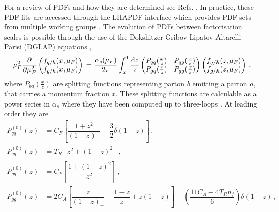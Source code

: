 \documentclass[main.tex]{subfiles}
\begin{document}
    For a review of PDFs and how they are determined
    see Refs. \cite{Ethier:2020way,Jimenez-Delgado:2013sma}.
    In practice, these PDF fits are accessed through the
    LHAPDF interface \cite{Buckley:2014ana} which provides
    PDF sets from multiple working groups \cite{PDF4LHCWorkingGroup:2022cjn,Hou:2019efy,Bailey:2020ooq,NNPDF:2021njg}.
    The evolution of PDFs between factorisation scales is possible
    through the use of the Dokshitzer-Gribov-Lipatov-Altarelli-Parisi (DGLAP)
    equations \cite{Dokshitzer:1977sg,Gribov:1972ri,Lipatov:1974qm,Altarelli:1977zs},
    \begin{equation}\label{eqn:DGLAP}
        \mu_{F}^{2} \dfrac{\partial}{\partial \mu_{F}^{2}}
        \begin{pmatrix}
            f_{q/h}(x,\mu_{F}) \\
            f_{g/h}(x,\mu_{F})
        \end{pmatrix} \\
        = \dfrac{\alpha_{s}(\mu_{F})}{2\pi} \int_{x}^{1} \dfrac{\mathrm{d}z}{z}
        \begin{pmatrix}
            P_{qq}(\frac{x}{z}) & P_{qg}(\frac{x}{z}) \\
            P_{gq}(\frac{x}{z}) & P_{gg}(\frac{x}{z})
        \end{pmatrix}
        \begin{pmatrix}
            f_{q/h}(z,\mu_{F}) \\
            f_{g/h}(z,\mu_{F})
        \end{pmatrix} \, ,
    \end{equation}
    where $P_{ba}(\frac{x}{z})$ are splitting functions
    representing parton $b$ emitting a parton $a$, that carries
    a momentum fraction $x$. These splitting functions are calculable
    as a power series in $\alpha_{s}$ where they have been computed
    up to three-loops \cite{Moch:2004pa,Vogt:2004mw}.
    At leading order they are \cite{Altarelli:1977zs}
    \begin{equation}\label{eqn:AP_kernels}
        \begin{split}
            P^{(0)}_{qq}(z) &= C_{F}\left[\dfrac{1+z^{2}}{(1-z)_{+}} + \dfrac{3}{2}\delta(1-z)\right] \, , \\
            P^{(0)}_{qg}(z) &= T_{R}\left[z^{2} + (1-z)^{2}\right] \, ,\\
            P^{(0)}_{gq}(z) &= C_{F}\left[\dfrac{1+(1-z)^{2}}{z^{2}}\right] \, ,\\
            P^{(0)}_{gg}(z) &= 2C_{A}\left[\dfrac{z}{(1-z)_{+}}+\dfrac{1-z}{z}+z(1-z)\right] + \left(\dfrac{11C_{A}-4T_{R}n_{f}}{6}\right)\delta(1-z) \, ,
        \end{split}
    \end{equation}
\end{document}

